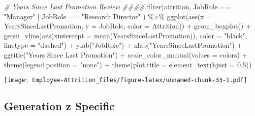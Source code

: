 \documentclass[
]{article}
\newenvironment{Shaded}{\begin{snugshade}}{\end{snugshade}}
\newcommand{\AttributeTok}[1]{\textcolor[rgb]{0.77,0.63,0.00}{#1}}
\newcommand{\CommentTok}[1]{\textcolor[rgb]{0.56,0.35,0.01}{\textit{#1}}}
\newcommand{\FloatTok}[1]{\textcolor[rgb]{0.00,0.00,0.81}{#1}}
\newcommand{\FunctionTok}[1]{\textcolor[rgb]{0.00,0.00,0.00}{#1}}
\newcommand{\NormalTok}[1]{#1}
\newcommand{\SpecialCharTok}[1]{\textcolor[rgb]{0.00,0.00,0.00}{#1}}
\newcommand{\StringTok}[1]{\textcolor[rgb]{0.31,0.60,0.02}{#1}}
\begin{document}
\begin{Shaded}
\begin{Highlighting}[]
\CommentTok{\# Years Since Last Promotion Review \#\#\#\#}
\FunctionTok{filter}\NormalTok{(attrition, JobRole }\SpecialCharTok{==} \StringTok{"Manager"} \SpecialCharTok{|}\NormalTok{ JobRole }\SpecialCharTok{==} \StringTok{"Research Director"}\NormalTok{ ) }\SpecialCharTok{\%\textgreater{}\%}
  \FunctionTok{ggplot}\NormalTok{(}\FunctionTok{aes}\NormalTok{(}\AttributeTok{x =}\NormalTok{ YearsSinceLastPromotion, }\AttributeTok{y =}\NormalTok{ JobRole, }\AttributeTok{color =}\NormalTok{ Attrition)) }\SpecialCharTok{+}
  \FunctionTok{geom\_boxplot}\NormalTok{() }\SpecialCharTok{+}
  \FunctionTok{geom\_vline}\NormalTok{(}\FunctionTok{aes}\NormalTok{(}\AttributeTok{xintercept =} \FunctionTok{mean}\NormalTok{(YearsSinceLastPromotion)), }\AttributeTok{color =} \StringTok{"black"}\NormalTok{, }\AttributeTok{linetype =} \StringTok{"dashed"}\NormalTok{) }\SpecialCharTok{+}
  \FunctionTok{ylab}\NormalTok{(}\StringTok{"JobRole"}\NormalTok{) }\SpecialCharTok{+}
  \FunctionTok{xlab}\NormalTok{(}\StringTok{"YearsSinceLastPromotion"}\NormalTok{) }\SpecialCharTok{+}
  \FunctionTok{ggtitle}\NormalTok{(}\StringTok{"Years Since Last Promotion"}\NormalTok{) }\SpecialCharTok{+}
  \FunctionTok{scale\_color\_manual}\NormalTok{(}\AttributeTok{values =}\NormalTok{ colors) }\SpecialCharTok{+}
  \FunctionTok{theme}\NormalTok{(}\AttributeTok{legend.position =} \StringTok{"none"}\NormalTok{) }\SpecialCharTok{+}
  \FunctionTok{theme}\NormalTok{(}\AttributeTok{plot.title =} \FunctionTok{element\_text}\NormalTok{(}\AttributeTok{hjust =} \FloatTok{0.5}\NormalTok{)) }
\end{Highlighting}
\end{Shaded}

\texttt{[image: Employee-Attrition\_files/figure-latex/unnamed-chunk-33-1.pdf]}

\hypertarget{generation-z-specific}{%
\subsection{Generation z Specific}\label{generation-z-specific}}
\end{document}
